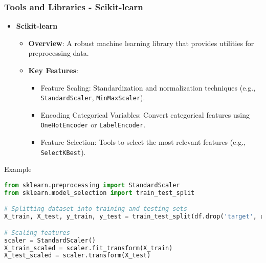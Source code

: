 \documentclass[aspectratio=169]{beamer}
\begin{document}
\begin{frame}[fragile]
    \frametitle{Tools and Libraries - Scikit-learn}
    \begin{itemize}
        \item \textbf{Scikit-learn}
        \begin{itemize}
            \item \textbf{Overview}: A robust machine learning library that provides utilities for preprocessing data.
            \item \textbf{Key Features}:
            \begin{itemize}
                \item Feature Scaling: Standardization and normalization techniques (e.g., \texttt{StandardScaler}, \texttt{MinMaxScaler}).
                \item Encoding Categorical Variables: Convert categorical features using \texttt{OneHotEncoder} or \texttt{LabelEncoder}.
                \item Feature Selection: Tools to select the most relevant features (e.g., \texttt{SelectKBest}).
            \end{itemize}
        \end{itemize}
    \end{itemize}
    
    \begin{block}{Example}
        \begin{lstlisting}[language=Python]
from sklearn.preprocessing import StandardScaler
from sklearn.model_selection import train_test_split

# Splitting dataset into training and testing sets
X_train, X_test, y_train, y_test = train_test_split(df.drop('target', axis=1), df['target'], test_size=0.2)

# Scaling features
scaler = StandardScaler()
X_train_scaled = scaler.fit_transform(X_train)
X_test_scaled = scaler.transform(X_test)
        \end{lstlisting}
    \end{block}
\end{frame}
\end{document}
